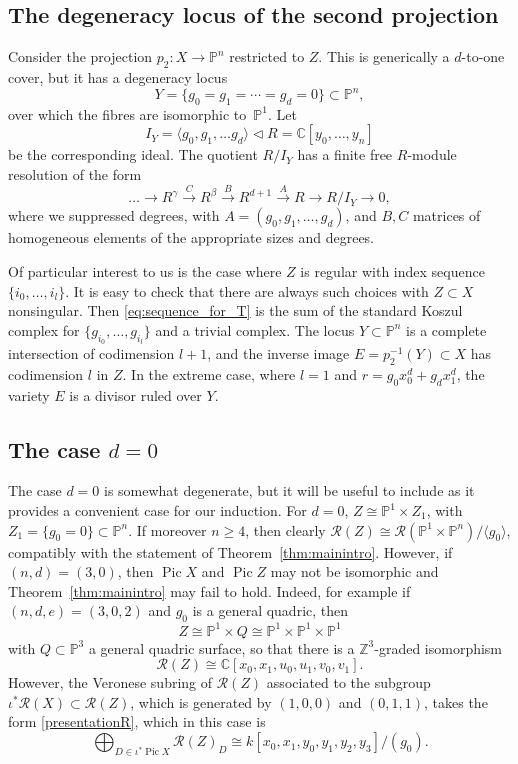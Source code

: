 \documentclass[a4paper,11pt]{amsart}
\theoremstyle{plain}
\theoremstyle{definition}
\newcommand{\C}{\mathbb{C}}
\newcommand{\p}{\mathbb{P}}
\newcommand{\R}{\mathcal{R}}
\newcommand{\Z}{\mathbb{Z}}
\DeclareMathOperator{\Pic}{Pic}
\begin{document}
\subsection{The degeneracy locus of the second projection}
Consider the projection $p_2\colon X\to\p^n$ restricted to $Z$. This is generically a $d$-to-one cover, but it has a degeneracy locus 
\[ Y = \{ g_0=g_1=\cdots = g_d=0\}\subset\p^n,\]
over which the fibres are isomorphic to~$\p^1$. Let 
\[ I_Y = \langle g_0, g_1, \ldots g_d\rangle \lhd R = \C[y_0, \ldots, y_n]\]
be the corresponding ideal. The quotient $R/I_Y$ has a finite free $R$-module resolution of the form 
\begin{equation} \label{eq:sequence_for_T} \ldots \longrightarrow R^{\gamma}  \stackrel{C}\longrightarrow R^{\beta}\stackrel{B}\longrightarrow R^{d+1}\stackrel{A}\longrightarrow R \longrightarrow R/I_Y\longrightarrow 0,\end{equation}
where we suppressed degrees, with $A=(g_0, g_1,\ldots , g_d)$, and $B,C$ matrices of homogeneous elements of the appropriate sizes and degrees. 

Of particular interest to us is the case where $Z$ is regular with index sequence $\{i_0,\ldots, i_l\}$. It is easy to check that there are always such choices with $Z \subset X$ nonsingular. Then \eqref{eq:sequence_for_T} is the sum of the standard Koszul complex for $\{g_{i_0},\dots,g_{i_l}\}$ and a trivial complex. The locus $Y \subset \p^n$ is a complete intersection of codimension $l+1$, and the inverse image $E = p_2^{-1}(Y) \subset X$ has codimension $l$ in $Z$. In the extreme case, where $l=1$ and $r = g_0 x_0^d + g_d x_1^d$, the variety $E$ is a divisor ruled over $Y$. 

\subsection{The case $d=0$}
The case $d=0$ is somewhat degenerate, but it will be useful to include as it provides a convenient case for our induction. For $d=0$, $Z \cong \p^1 \times Z_1$, with $Z_1= \{g_0=0\} \subset \p^n$. If moreover $n \geq 4$, then clearly $\R(Z) \cong \R(\p^1\times\p^n)/\langle g_0\rangle$, compatibly with the statement of Theorem~\ref{thm:mainintro}. However, if $(n,d) = (3,0)$, then $\Pic X$ and $\Pic Z$ may not be isomorphic and Theorem~\ref{thm:mainintro} may fail to hold. Indeed, for example if $(n,d,e) = (3,0,2)$ and $g_0$ is a general quadric, then \[Z\cong \p^1\times Q \cong \p^1 \times \p^1 \times \p^1\]
with $Q\subset\p^3$ a general quadric surface, so that there is a $\Z^3$-graded isomorphism
    \[
    \R(Z) \cong \C[x_0,x_1,u_0,u_1,v_0,v_1].
    \]
However, the Veronese subring of $\R(Z)$ associated to the subgroup $\iota^* \R(X) \subset \R(Z)$, which is generated by $(1,0,0)$ and $(0,1,1)$, takes the form \eqref{presentationR}, which in this case is
 \[  \bigoplus_{D\in\iota^*\!\Pic X}\R(Z)_D \cong k[x_0,x_1,y_0,y_1,y_2,y_3]/(g_0). \]
\end{document}
